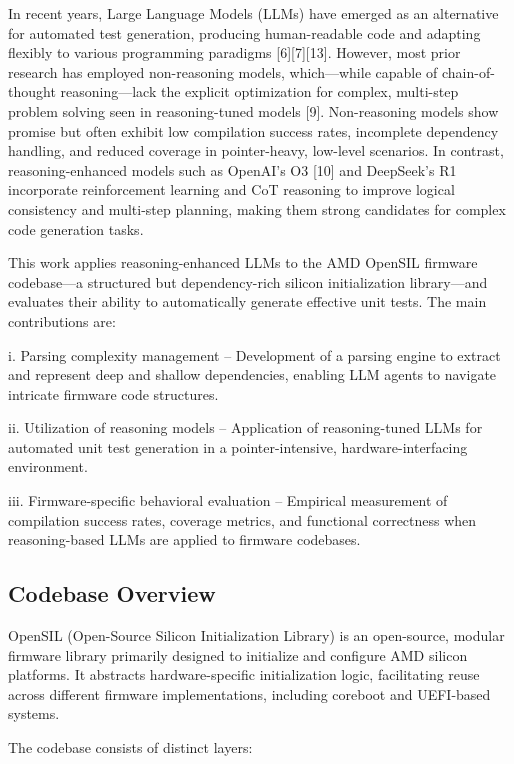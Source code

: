 \documentclass[conference]{IEEEtran}
\begin{document}
In recent years, Large Language Models (LLMs) have emerged as an alternative for automated test generation, producing human-readable code and adapting flexibly to various programming paradigms [6][7][13]. However, most prior research has employed non-reasoning models, which—while capable of chain-of-thought reasoning—lack the explicit optimization for complex, multi-step problem solving seen in reasoning-tuned models [9]. Non-reasoning models show promise but often exhibit low compilation success rates, incomplete dependency handling, and reduced coverage in pointer-heavy, low-level scenarios. In contrast, reasoning-enhanced models such as OpenAI’s O3 [10] and DeepSeek’s R1 incorporate reinforcement learning and CoT reasoning to improve logical consistency and multi-step planning, making them strong candidates for complex code generation tasks. 

This work applies reasoning-enhanced LLMs to the AMD OpenSIL firmware codebase—a structured but dependency-rich silicon initialization library—and evaluates their ability to automatically generate effective unit tests. The main contributions are: 

i. Parsing complexity management – Development of a parsing engine to extract and represent deep and shallow dependencies, enabling LLM agents to navigate intricate firmware code structures.

ii. Utilization of reasoning models – Application of reasoning-tuned LLMs for automated unit test generation in a pointer-intensive, hardware-interfacing environment.

iii. Firmware-specific behavioral evaluation – Empirical measurement of compilation success rates, coverage metrics, and functional correctness when reasoning-based LLMs are applied to firmware codebases.

\subsection{Codebase Overview}
OpenSIL (Open-Source Silicon Initialization Library) is an open-source, modular firmware library primarily designed to initialize and configure AMD silicon platforms. It abstracts hardware-specific initialization logic, facilitating reuse across different firmware implementations, including coreboot and UEFI-based systems. 

The codebase consists of distinct layers:
\end{document}
